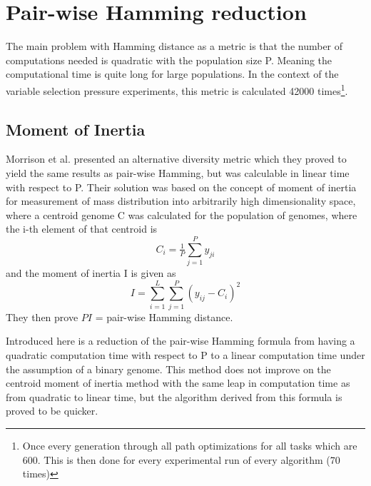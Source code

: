 \chapter{Pair-wise Hamming reduction}
\label{appendix:Hammingreduction}
The main problem with Hamming distance as a metric is that the number of computations needed is quadratic with the population size P. Meaning the computational time is quite long for large populations. In the context of the variable selection pressure experiments, this metric is calculated 42000 times\footnote{Once every generation through all path optimizations for all tasks which are 600. This is then done for every experimental run of every algorithm (70 times)}.

\section{Moment of Inertia}
Morrison et al. presented\cite{populationDiversity} an alternative diversity metric which they proved to yield the same results as pair-wise Hamming, but was calculable in linear time with respect to P. Their solution was based on the concept of moment of inertia for measurement of mass distribution into arbitrarily high dimensionality space, where a centroid genome C was calculated for the population of genomes, where the i-th element of that centroid is
\begin{equation}
    \label{eq:centroid}
    C_{i}=\tfrac{1}{P}\sum_{j=1}^{P}y_{ji}
\end{equation}
and the moment of inertia I is given as 
\begin{equation}
    \label{eq:Inertiadiversity}
    I  = \sum_{i=1}^{L}\sum_{j=1}^{P}\left ( y_{ij}-C_{i} \right )^{2}
\end{equation}
They then prove \(PI\) = pair-wise Hamming distance.

Introduced here is a reduction of the pair-wise Hamming formula from having a quadratic computation time with respect to P to a linear computation time under the assumption of a binary genome. This method does not improve on the centroid moment of inertia method with the same leap in computation time as from quadratic to linear time, but the algorithm derived from this formula is proved to be quicker. 

